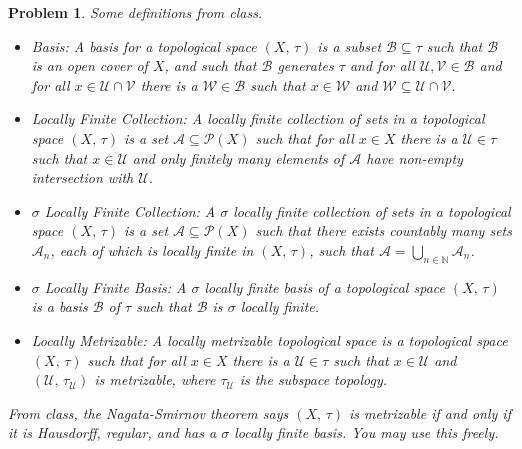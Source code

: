 \documentclass{article}
\theoremstyle{normal}
\newtheorem{problem}{Problem}
\begin{document}
    \begin{problem}
        Some definitions from class.
        \begin{itemize}
            \item Basis: A basis for a topological space $(X,\,\tau)$ is a
                subset $\mathcal{B}\subseteq\tau$ such that $\mathcal{B}$ is an
                open cover of $X$, and such that $\mathcal{B}$ generates $\tau$
                and for all $\mathcal{U},\mathcal{V}\in\mathcal{B}$ and for all
                $x\in\mathcal{U}\cap\mathcal{V}$ there is a
                $\mathcal{W}\in\mathcal{B}$ such that $x\in\mathcal{W}$ and
                $\mathcal{W}\subseteq\mathcal{U}\cap\mathcal{V}$.
            \item Locally Finite Collection: A locally finite collection of
                sets in a topological space $(X,\,\tau)$ is a set
                $\mathcal{A}\subseteq\mathcal{P}(X)$ such that for all $x\in{X}$
                there is a $\mathcal{U}\in\tau$ such that $x\in\mathcal{U}$ and
                only finitely many elements of $\mathcal{A}$ have non-empty
                intersection with $\mathcal{U}$.
            \item $\sigma$ Locally Finite Collection: A $\sigma$ locally finite
                collection of sets in a topological space $(X,\,\tau)$ is a set
                $\mathcal{A}\subseteq\mathcal{P}(X)$ such that there exists
                countably many sets $\mathcal{A}_{n}$, each of which is locally
                finite in $(X,\,\tau)$, such that
                $\mathcal{A}=\bigcup_{n\in\mathbb{N}}\mathcal{A}_{n}$.
            \item $\sigma$ Locally Finite Basis: A $\sigma$ locally finite
                basis of a topological space $(X,\,\tau)$ is a basis
                $\mathcal{B}$ of $\tau$ such that $\mathcal{B}$ is $\sigma$
                locally finite.
            \item Locally Metrizable: A locally metrizable topological space
                is a topological space $(X,\,\tau)$ such that for all $x\in{X}$
                there is a $\mathcal{U}\in\tau$ such that $x\in\mathcal{U}$ and
                $(\mathcal{U},\,\tau_{\mathcal{U}})$ is metrizable, where
                $\tau_{\mathcal{U}}$ is the subspace topology.
        \end{itemize}
        From class, the Nagata-Smirnov theorem says $(X,\,\tau)$ is metrizable
        if and only if it is Hausdorff, regular,
        and has a $\sigma$ locally finite basis. You may use this freely.

\end{problem}
\end{document}
